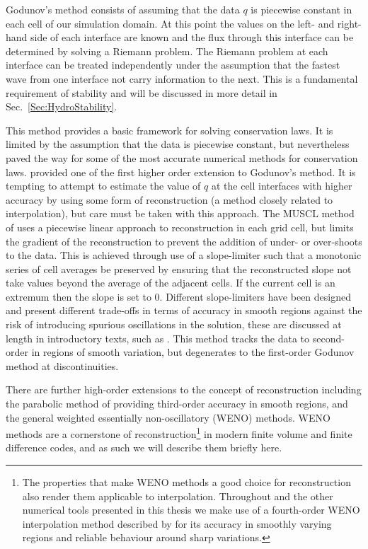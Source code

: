 Godunov's method \citep{Godunov1959} consists of assuming that the data $q$ is piecewise constant in each cell of our simulation domain.
At this point the values on the left- and right-hand side of each interface are known and the flux through this interface can be determined by solving a Riemann problem.
The Riemann problem at each interface can be treated independently under the assumption that the fastest wave from one interface not carry information to the next.
This is a fundamental requirement of stability and will be discussed in more detail in Sec.~\ref{Sec:HydroStability}.

This method provides a basic framework for solving conservation laws.
It is limited by the assumption that the data is piecewise constant, but nevertheless paved the way for some of the most accurate numerical methods for conservation laws.
\citet{VanLeer1979} provided one of the first higher order extension to Godunov's method.
It is tempting to attempt to estimate the value of $q$ at the cell interfaces with higher accuracy by using some form of reconstruction (a method closely related to interpolation), but care must be taken with this approach.
The MUSCL method of \citet{VanLeer1979} uses a piecewise linear approach to reconstruction in each grid cell, but limits the gradient of the reconstruction to prevent the addition of under- or over-shoots to the data.
This is achieved through use of a slope-limiter such that a monotonic series of cell averages be preserved by ensuring that the reconstructed slope not take values beyond the average of the adjacent cells.
If the current cell is an extremum then the slope is set to 0.
Different slope-limiters have been designed and present different trade-offs in terms of accuracy in smooth regions against the risk of introducing spurious oscillations in the solution, these are discussed at length in introductory texts, such as \citet{LeVeque1997}.
This method tracks the data to second-order in regions of smooth variation, but degenerates to the first-order Godunov method at discontinuities.

There are further high-order extensions to the concept of reconstruction including the parabolic method of \citet{Colella1984} providing third-order accuracy in smooth regions, and the general weighted essentially non-oscillatory (WENO) methods.
WENO methods are a cornerstone of reconstruction\footnote{The properties that make WENO methods a good choice for reconstruction also render them applicable to interpolation. Throughout \Lw{} and the other numerical tools presented in this thesis we make use of a fourth-order WENO interpolation method described by \citet{Janett2019} for its accuracy in smoothly varying regions and reliable behaviour around sharp variations.} in modern finite volume and finite difference codes, and as such we will describe them briefly here.


